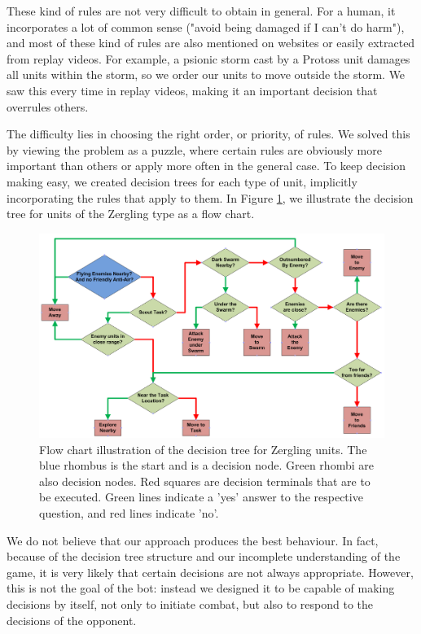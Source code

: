 These kind of rules are not very difficult to obtain in general. For a human, it incorporates a lot of common sense ("avoid being damaged if I can't do harm"), and most of these kind of rules are also mentioned on websites or easily extracted from replay videos. For example, a psionic storm cast by a Protoss unit damages all units within the storm, so we order our units to move outside the storm. We saw this every time in replay videos, making it an important decision that overrules others. 

The difficulty lies in choosing the right order, or priority, of rules. We solved this by viewing the problem as a puzzle, where certain rules are obviously more important than others or apply more often in the general case. To keep decision making easy, we created decision trees for each type of unit, implicitly incorporating the rules that apply to them. In Figure \ref{fig:micro}, we illustrate the decision tree for units of the Zergling type as a flow chart.

\begin{figure}
\centering
\includegraphics[scale=0.35]{starcraft_zerg_diagram_groot}
\caption{\label{fig:micro} Flow chart illustration of the decision tree for Zergling units. The blue rhombus is the start and is a decision node. Green rhombi are also decision nodes. Red squares are decision terminals that are to be executed. Green lines indicate a 'yes' answer to the respective question, and red lines indicate 'no'.}
\end{figure}

We do not believe that our approach produces the best behaviour. In fact, because of the decision tree structure and our incomplete understanding of the game, it is very likely that certain decisions are not always appropriate. However, this is not the goal of the bot: instead we designed it to be capable of making decisions by itself, not only to initiate combat, but also to respond to the decisions of the opponent.

